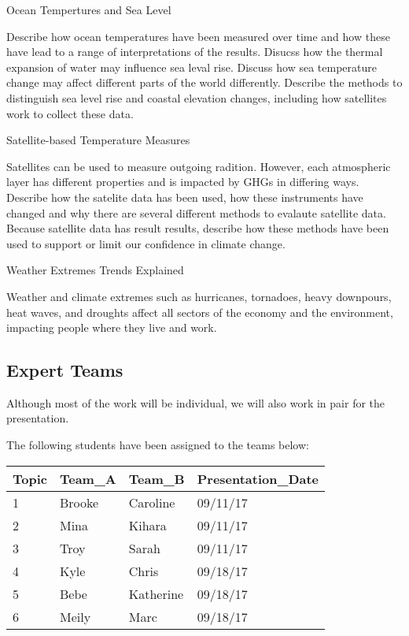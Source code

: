 \documentclass{article}\usepackage[]{graphicx}\usepackage[]{color}
\newenvironment{enumerate*}%
  {\begin{enumerate}%
    \setlength{\itemsep}{0pt}%
    \setlength{\parskip}{0pt}}%
  {\end{enumerate}}
\begin{document}
\begin{enumerate*}
  \item Ocean Tempertures and Sea Level

Describe how ocean temperatures have been measured over time and how these have lead to a range of interpretations of the results. Disucss how the thermal expansion of water may influence sea leval rise. Discuss how sea temperature change may affect different parts of the world differently. Describe the methods to distinguish sea level rise and coastal elevation changes, including how satellites work to collect these data.  

  \item Satellite-based Temperature Measures
  
Satellites can be used to measure outgoing radition. However, each atmospheric layer has different properties and is impacted by GHGs in differing ways. Describe how the satelite data has been used, how these instruments have changed and why there are several different methods to evalaute satellite data. Because satellite data has result results, describe how these methods have been used to support or limit our confidence in climate change.
  
  \item Weather Extremes Trends Explained
  
Weather and climate extremes such as hurricanes, tornadoes, heavy downpours, heat waves, and droughts affect all sectors of the economy and the environment, impacting people where they live and work.  
  
\end{enumerate*}

\subsection{Expert Teams}

Although most of the work will be individual, we will also work in pair for the presentation. 

The following students have been assigned to the teams below:

\begin{table}[ht]
\centering
\begin{tabular}{llll}
  \hline
Topic & Team\_A & Team\_B & Presentation\_Date \\ 
  \hline
1 & Brooke & Caroline & 09/11/17 \\ 
  2 & Mina & Kihara & 09/11/17 \\ 
  3 & Troy & Sarah & 09/11/17 \\ 
  4 & Kyle & Chris & 09/18/17 \\ 
  5 & Bebe & Katherine & 09/18/17 \\ 
  6 & Meily & Marc & 09/18/17 \\ 
   \hline
\end{tabular}
\end{table}
\end{document}
